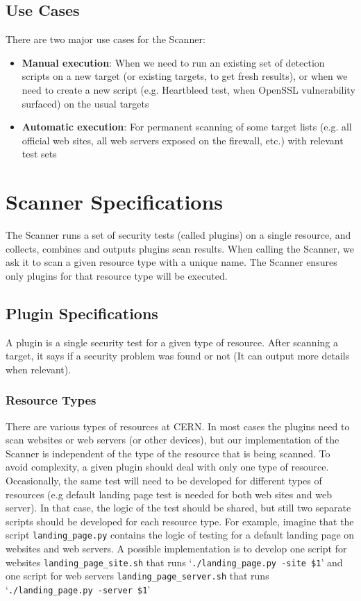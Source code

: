 \subsection{Use Cases}
There are two major use cases for the Scanner:
\begin{itemize}
\item \textbf{Manual execution}: When we need to run an existing set of detection scripts on a new target (or existing targets, to get fresh results), or when we need to create a new script (e.g. Heartbleed test, when OpenSSL vulnerability surfaced) on the usual targets
\item \textbf{Automatic execution}: For permanent scanning of some target lists (e.g. all official web sites, all web servers exposed on the firewall, etc.) with relevant test sets
\end{itemize}

\section{Scanner Specifications}

The Scanner runs a set of security tests (called plugins) on a single resource, and collects, combines and outputs plugins scan results. When calling the Scanner, we ask it to scan a given resource type with a unique name. The Scanner ensures only plugins for that resource type will be executed. 

\subsection{Plugin Specifications}
A plugin is a single security test for a given type of resource. After scanning a target, it says if a security problem was found or not (It can output more details when relevant). 
\subsubsection{Resource Types}
There are various types of resources at CERN. In most cases the plugins need to scan websites or web servers (or other devices), but our implementation of the Scanner is independent of the type of the resource that is being scanned. To avoid complexity, a given plugin should deal with only one type of resource. Occasionally, the same test will need to be developed for different types of resources (e.g default landing page test is needed for both web sites and web server). In that case, the logic of the test should be shared, but still two separate scripts should be developed for each resource type. For example, imagine that the script \texttt{landing\_page.py} contains the logic of testing for a default landing page on websites and web servers. A possible implementation is to develop one script for websites \texttt{landing\_page\_site.sh} that runs `\texttt{./landing\_page.py -site \$1}' and one script for web servers \texttt{landing\_page\_server.sh} that runs `\texttt{./landing\_page.py -server \$1}' 
